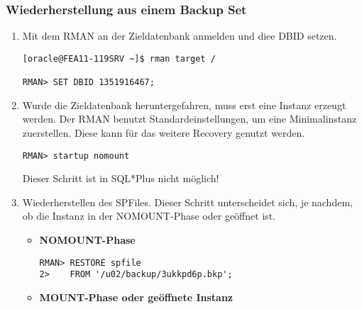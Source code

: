         \subsubsection{Wiederherstellung aus einem Backup Set}
          \begin{enumerate}
            \item Mit dem RMAN an der Zieldatenbank anmelden und diee DBID setzen.
              \begin{lstlisting}[caption={An der Zieldatenbank anmelden und die DBID setzen},label=admin1424,language=rman]
[oracle@FEA11-119SRV ~]$ rman target /

RMAN> SET DBID 1351916467;
                  \end{lstlisting}
            \item Wurde die Zieldatenbank heruntergefahren, muss erst eine Instanz erzeugt werden. Der RMAN benutzt Standardeinstellungen, um eine Minimalinstanz zuerstellen. Diese kann f\"ur das weitere Recovery genutzt werden.
              \begin{lstlisting}[caption={Zieldatenbank im RMAN in den NOMOUNT-Status bringen},label=admin1425,language=rman]
RMAN> startup nomount
              \end{lstlisting}
              \begin{merke}
                Dieser Schritt ist in SQL*Plus nicht m\"oglich!
              \end{merke}
            \item Wiederherstellen des SPFiles. Dieser Schritt unterscheidet sich, je nachdem, ob die Instanz in der NOMOUNT-Phase oder ge\"offnet ist.
              \begin{itemize}
                \item \textbf{NOMOUNT-Phase}
                  \begin{lstlisting}[caption={Wiederherstellen des SPFiles in der NOMOUNT-Phase},label=admin1426,language=rman]
RMAN> RESTORE spfile
2>    FROM '/u02/backup/3ukkpd6p.bkp';
                  \end{lstlisting}
\clearpage
                \item \textbf{MOUNT-Phase oder ge\"offnete Instanz}


\end{itemize}
\end{enumerate}
